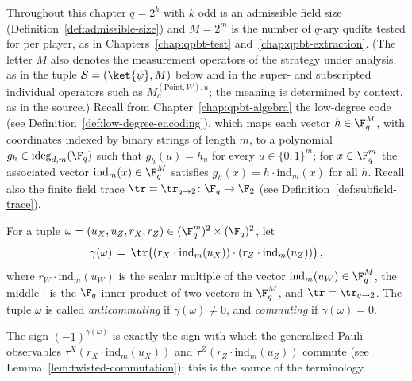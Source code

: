 Throughout this chapter $q = 2^k$ with $k$ odd is an admissible field size
(Definition~\ref{def:admissible-size}) and $M = 2^m$ is the number of
$q$-ary qudits tested for per player, as in
Chapters~\ref{chap:qpbt-test} and~\ref{chap:qpbt-extraction}. (The letter
$M$ also denotes the measurement operators of the strategy under analysis,
as in the tuple $\mathcal{S} = (\ket{\psi}, M)$ below and in the
super- and subscripted individual operators such as
$M^{(\mathrm{Point},W),u}_a$; the meaning is determined by context, as in
the source.) Recall from
Chapter~\ref{chap:qpbt-algebra} the low-degree code
(see Definition~\ref{def:low-degree-encoding}), which maps each vector
$h \in \F_q^{M}$, with
coordinates indexed by binary strings of length $m$, to a polynomial
$g_h \in \mathrm{ideg}_{d,m}(\F_q)$ such that $g_h(u) = h_u$ for every
$u \in \{0,1\}^m$; for $x \in \F_q^m$ the associated vector
$\mathrm{ind}_m(x) \in \F_q^{M}$ satisfies
$g_h(x) = h \cdot \mathrm{ind}_m(x)$ for all $h$. Recall also the finite
field trace $\tr = \tr_{q \to 2} \colon \F_q \to \F_2$
(see Definition~\ref{def:subfield-trace}).

\begin{definition}
	\label{def:anticommuting-tuple}
	\leanok
	For a tuple
	$\omega = (u_X, u_Z, r_X, r_Z) \in (\F_q^m)^2 \times (\F_q)^2$, let
	\[
		\gamma(\omega) \,=\, \tr\big( (r_X \cdot \mathrm{ind}_m(u_X)) \cdot (r_Z \cdot \mathrm{ind}_m(u_Z)) \big)\,,
	\]
	where $r_W \cdot \mathrm{ind}_m(u_W)$ is the scalar multiple of the
	vector $\mathrm{ind}_m(u_W) \in \F_q^{M}$, the middle $\cdot$ is the
	$\F_q$-inner product of two vectors in $\F_q^{M}$, and
	$\tr = \tr_{q \to 2}$. The tuple $\omega$ is called \emph{anticommuting}
	if $\gamma(\omega) \neq 0$, and \emph{commuting} if $\gamma(\omega) = 0$.
\end{definition}

The sign $(-1)^{\gamma(\omega)}$ is exactly the sign with which the
generalized Pauli observables $\tau^X(r_X \cdot \mathrm{ind}_m(u_X))$ and
$\tau^Z(r_Z \cdot \mathrm{ind}_m(u_Z))$ commute
(see Lemma~\ref{lem:twisted-commutation});
this is the source of the terminology.

